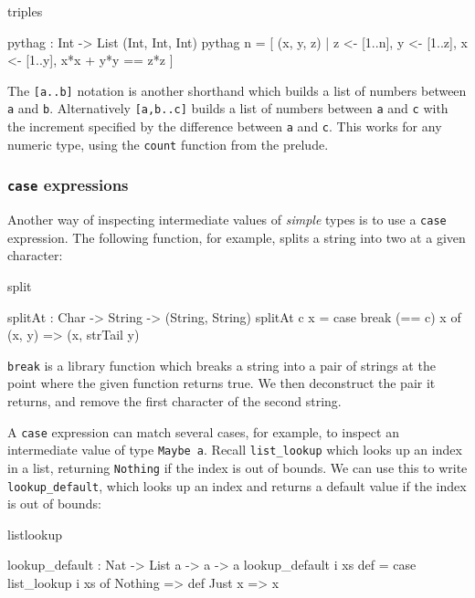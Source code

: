 \begin{SaveVerbatim}{triples}

pythag : Int -> List (Int, Int, Int)
pythag n = [ (x, y, z) | z <- [1..n], y <- [1..z], x <- [1..y],
                         x*x + y*y == z*z ]
  
\end{SaveVerbatim}

\noindent
The \texttt{[a..b]} notation is another shorthand which builds a list of
numbers between \texttt{a} and \texttt{b}.  Alternatively \texttt{[a,b..c]}
builds a list of numbers between \texttt{a} and \texttt{c} with the increment
specified by the difference between \texttt{a} and \texttt{c}.  This works for
any numeric type, using the \texttt{count} function from the prelude. 

\subsubsection*{\texttt{case} expressions}

Another way of inspecting intermediate values of \emph{simple} types
is to use a \texttt{case} expression.
The following function, for example, splits a string into two at a given character:

\begin{SaveVerbatim}{split}

splitAt : Char -> String -> (String, String)
splitAt c x = case break (== c) x of
                  (x, y) => (x, strTail y)

\end{SaveVerbatim}

\noindent
\texttt{break} is a library function which breaks a string into a pair of strings
at the point where the given function returns true. We then deconstruct the
pair it returns, and remove the first character of the second string.

A \texttt{case} expression can match several cases, for example, to inspect an
intermediate value of type \texttt{Maybe a}. Recall \texttt{list\_lookup} which
looks up an index in a list, returning \texttt{Nothing} if the index is out
of bounds. We can use this to write \texttt{lookup\_default}, which
looks up an index and returns a default value if the index is out of bounds:

\begin{SaveVerbatim}{listlookup}

lookup_default : Nat -> List a -> a -> a
lookup_default i xs def = case list_lookup i xs of
                              Nothing => def
                              Just x => x

\end{SaveVerbatim}

